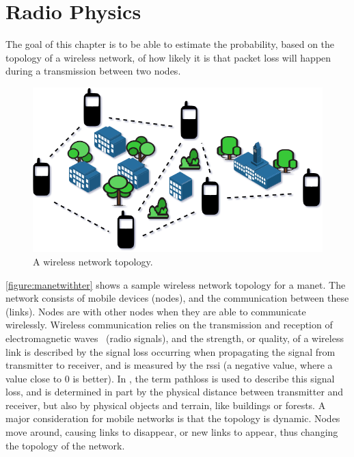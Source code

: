 \chapter{Radio Physics}
The goal of this chapter is to be able to estimate the probability, based on the topology of a wireless
network, of how likely it is that packet loss will happen during a transmission between two nodes.


\begin{figure}[ht]
    \centering
    \includegraphics[width=.7\textwidth]{figures/manet_with_terrain.png}
    \caption{A wireless network topology.}
    \label{figure:manetwithter}
\end{figure}

\autoref{figure:manetwithter} shows a sample wireless network topology for a \acrfull{manet}. The network
consists of mobile devices (nodes), and the communication between these (links). Nodes are
 with other nodes when they are able to communicate wirelessly. Wireless communication
relies on the transmission and reception of electromagnetic waves~\cite[p.~10]{paper:linkmodel} (radio
signals), and the strength, or quality, of a wireless link is described by the signal loss occurring when
propagating the signal from transmitter to receiver, and is measured by the \gls{rssi} (a negative value,
where a value close to 0 is better). In \cite{paper:linkmodel}, the term \gls{pathloss} is used to describe
this signal loss, and is determined in part by the physical distance between transmitter and receiver, but
also by physical objects and terrain, like buildings or forests. A major consideration for mobile networks is
that the topology is dynamic. Nodes move around, causing links to disappear, or new links to appear, thus 
changing the topology of the network.




